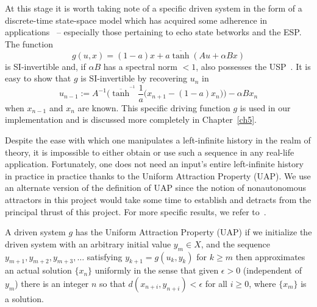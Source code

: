 
At this stage it is worth taking note of a specific driven system in the form of a discrete-time state-space model which has acquired some adherence in applications~\cite{Manju_IEEE} -- especially those pertaining to echo state betworks and the ESP. The function 
\begin{equation}  \label{eqn_driving}
  g(u,x) = (1-a)x + a\overline{\tanh}(Au + \alpha Bx)
\end{equation} 
is SI-invertible and, if $\alpha B$ has a spectral norm $<1$, also possesses the USP~\cite[Theorem.2]{manjunath2013echo }. 
It is easy to show that $g$ is SI-invertible by recovering $u_n$ in 
\begin{equation} \label{eqn_SI_RNN}
  u_{n-1} := A^{-1}\bigg(\overline{\tanh}^{^{-1}}\frac{1}{a}\Big(x_{n+1}-(1-a)x_n\Big) \bigg) - \alpha B x_n
  \end{equation}
  when $x_{n-1}$ and $x_n$ are known.
This specific driving function $g$ is used in our implementation and is discussed more completely in Chapter~\ref{ch5}.

Despite the ease with which one manipulates a left-infinite history in the realm of theory, it is impossible to either obtain or use such a sequence in any real-life application.
Fortunately, one does not need an input's entire left-infinite history in practice in practice thanks to the Uniform Attraction Property (UAP). 
We use an alternate version of the definition of UAP since the notion of nonautonomous attractors in this project would take some time to establish and detracts from the principal thrust of this project. For more specific results, we refer to~\cite{Manju_Nonlinearity}. 

\begin{Definition}
  \label{Dfn_UAP}\rm
  A driven system $g$ has the Uniform Attraction Property (UAP) if we initialize the driven system
with an arbitrary initial value $y_m \in X$, and the sequence $y_{m+1}, y_{m+2}, y_{m+3},\ldots$ satisfying $y_{k+1}= g(u_k,y_k)$ for $k \geq m$ then approximates an actual solution $\{x_n\}$ uniformly in the sense that given $\epsilon>0$ (independent of $y_m$) there is an integer $n$ so that $d(x_{n+i}, y_{n+i})<\epsilon$ for all $i\ge 0$, where $\{x_m\}$ is a solution.
\end{Definition}

